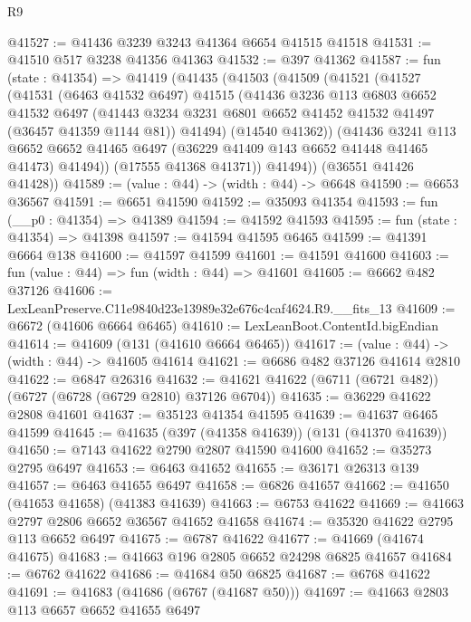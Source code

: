 \begin{lexlean}{R9}
\begin{coremodule}
@41527 := @41436 @3239 @3243 @41364 @6654 @41515 @41518
@41531 := @41510 @517 @3238 @41356 @41363
@41532 := @397 @41362
@41587 := fun (state : @41354) =>
  @41419
    (@41435
      (@41503
        (@41509
          (@41521
            (@41527
              (@41531
                (@6463 @41532 @6497)
                @41515
                (@41436
                  @3236
                  @113
                  @6803
                  @6652
                  @41532
                  @6497
                  (@41443 @3234 @3231 @6801 @6652 @41452 @41532 @41497 (@36457 @41359 @1144 @81))
                  @41494)
                (@14540 @41362))
              (@41436
                @3241
                @113
                @6652
                @6652
                @41465
                @6497
                (@36229 @41409 @143 @6652 @41448 @41465 @41473)
                @41494))
            (@17555 @41368 @41371))
          @41494))
      (@36551 @41426 @41428))
@41589 := (value : @44) -> (width : @44) -> @6648
@41590 := @6653 @36567
@41591 := @6651 @41590
@41592 := @35093 @41354
@41593 := fun (__p0 : @41354) => @41389
@41594 := @41592 @41593
@41595 := fun (state : @41354) => @41398
@41597 := @41594 @41595 @6465
@41599 := @41391 @6664 @138
@41600 := @41597 @41599
@41601 := @41591 @41600
@41603 := fun (value : @44) => fun (width : @44) => @41601
@41605 := @6662 @482 @37126
@41606 := LexLeanPreserve.C11e9840d23e13989e32e676c4caf4624.R9.__fits_13
@41609 := @6672 (@41606 @6664 @6465)
@41610 := LexLeanBoot.ContentId.bigEndian
@41614 := @41609 (@131 (@41610 @6664 @6465))
@41617 := (value : @44) -> (width : @44) -> @41605 @41614
@41621 := @6686 @482 @37126 @41614 @2810
@41622 := @6847 @26316
@41632 := @41621 @41622 (@6711 (@6721 @482)) (@6727 (@6728 (@6729 @2810) @37126 @6704))
@41635 := @36229 @41622 @2808 @41601
@41637 := @35123 @41354 @41595
@41639 := @41637 @6465 @41599
@41645 := @41635 (@397 (@41358 @41639)) (@131 (@41370 @41639))
@41650 := @7143 @41622 @2790 @2807 @41590 @41600
@41652 := @35273 @2795 @6497
@41653 := @6463 @41652
@41655 := @36171 @26313 @139
@41657 := @6463 @41655 @6497
@41658 := @6826 @41657
@41662 := @41650 (@41653 @41658) (@41383 @41639)
@41663 := @6753 @41622
@41669 := @41663 @2797 @2806 @6652 @36567 @41652 @41658
@41674 := @35320 @41622 @2795 @113 @6652 @6497
@41675 := @6787 @41622
@41677 := @41669 (@41674 @41675)
@41683 := @41663 @196 @2805 @6652 @24298 @6825 @41657
@41684 := @6762 @41622
@41686 := @41684 @50 @6825
@41687 := @6768 @41622
@41691 := @41683 (@41686 (@6767 (@41687 @50)))
@41697 := @41663 @2803 @113 @6657 @6652 @41655 @6497

\end{coremodule}
\end{lexlean}
